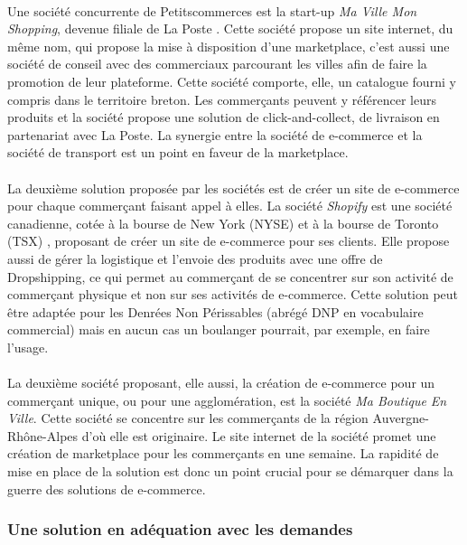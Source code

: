 \documentclass[a4paper, 12pt]{article}
\begin{document}
\paragraph{}Une société concurrente de Petitscommerces est la start-up \textit{Ma Ville Mon Shopping}, devenue filiale de La Poste \cite{mavillemonshopping}. Cette société propose un site internet, du même nom, qui propose la mise à disposition d’une marketplace, c’est aussi une société de conseil avec des commerciaux parcourant les villes afin de faire la promotion de leur plateforme. Cette société comporte, elle, un catalogue fourni y compris dans le territoire breton. Les commerçants peuvent y référencer leurs produits et la société propose une solution de click-and-collect, de livraison en partenariat avec La Poste. La synergie entre la société de e-commerce et la société de transport est un point en faveur de la marketplace.
\paragraph{}La deuxième solution proposée par les sociétés est de créer un site de e-commerce pour chaque commerçant faisant appel à elles. La société \textit{Shopify} est une société canadienne, cotée à la bourse de New York (NYSE) et à la bourse de Toronto (TSX) \cite{shopify}, proposant de créer un site de e-commerce pour ses clients. Elle propose aussi de gérer la logistique et l’envoie des produits avec une offre de Dropshipping, ce qui permet au commerçant de se concentrer sur son activité de commerçant physique et non sur ses activités de e-commerce. Cette solution peut être adaptée pour les Denrées Non Périssables (abrégé DNP en vocabulaire commercial) mais en aucun cas un boulanger pourrait, par exemple, en faire l’usage.
\paragraph{}La deuxième société proposant, elle aussi, la création de e-commerce pour un commerçant unique, ou pour une agglomération, est la société \textit{Ma Boutique En Ville}. Cette société se concentre sur les commerçants de la région Auvergne-Rhône-Alpes d’où elle est originaire. Le site internet \cite{maboutiqueenville} de la société promet une création de marketplace pour les commerçants en une semaine. La rapidité de mise en place de la solution est donc un point crucial pour se démarquer dans la guerre des solutions de e-commerce.

\subsubsection{Une solution en adéquation avec les demandes}
\end{document}
